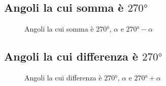\subsection{Angoli la cui somma è $\ang{270}$}
\begin{figure} %
	\centering
	
	\caption{Angoli la cui somma è $\ang{270}$,  $\alpha$ e $\ang{270}-\alpha$}
	\label{tab:graficiangolicomplementari3}
\end{figure}
\subsection{Angoli la cui differenza è $\ang{270}$}
\begin{figure} %
	\centering
	
	\caption{Angoli la cui differenza è $\ang{270}$, $\alpha$ e $\ang{270}+\alpha$}
	\label{tab:graficiangolicomplementari4}
\end{figure}
